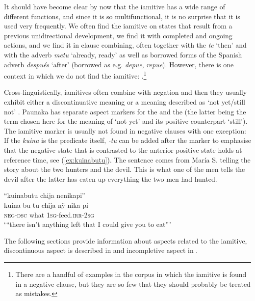 It should have become clear by now that the iamitive has a wide range of different functions, and since it is so multifunctional, it is no surprise that it is used very frequently. We often find the iamitive on states that result from a previous unidirectional development, we find it with completed and ongoing actions, and we find it in clause combining, often together with the   \textit{te} ‘then’ and with the adverb \textit{metu} ‘already, ready’ as well as borrowed forms of the Spanish adverb \textit{después} ‘after’ (borrowed as e.g. \textit{depue}, \textit{repue}). However, there is one context in which we do not find the iamitive: .\footnote{There are a handful of examples in the corpus in which the iamitive is found in a negative clause, but they are so few that they should probably be treated as mistakes.} 

Cross-linguistically, iamitives often combine with negation and then they usually exhibit either a discontinuative meaning or a meaning described as ‘not yet/still not’ \citep[cf.][35--36]{Olsson2013}. Paunaka  has separate aspect markers for the  and the  (the latter being the term chosen here for the meaning of ‘not yet’ and its positive counterpart ‘still’). The iamitive marker is usually not found in negative clauses with one exception: If the  \textit{kuina} is the predicate itself, \textit{-tu} can be added after the  marker to emphasise that the negative state that is contrasted to the anterior positive state holds at reference time, see (\ref{ex:kuinabutu}). The sentence comes from María S. telling the story about the two hunters and the devil. This is what one of the men tells the devil after the latter has eaten up everything the two men had hunted.

 \ea\label{ex:kuinabutu}
\begingl
\glpreamble “kuinabutu chija nenikapi”\\
\gla kuina-bu-tu chija nÿ-nika-pi\\
\glb \textsc{neg}-\textsc{dsc} what 1\textsc{sg}-feed.\textsc{irr}-2\textsc{sg}\\
\glft ‘“there isn’t anything left that I could give you to eat”’
\endgl
\trailingcitation{[rxx-n120511l-2.45-46]}
\xe

The following sections provide information about aspects related to the iamitive, discontinuous aspect is described in  and incompletive aspect in . 


